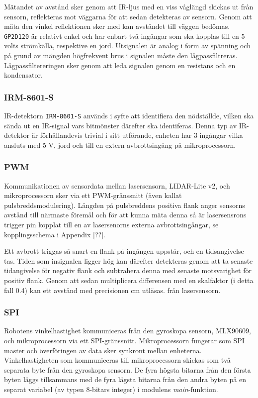 \documentclass[11pt]{article}
\begin{document}
\begin{flushleft}
Mätandet av avstånd sker genom att IR-ljus med en viss våglängd skickas ut från sensorn, reflekteras mot väggarna för att sedan detekteras av sensorn. Genom att mäta den vinkel reflektionen sker med kan avståndet till väggen bedömas. \verb+GP2D120+ är relativt enkel och har enbart två ingångar som ska kopplas till en 5 volts strömkälla, respektive en jord.  Utsignalen är analog i form av spänning och på grund av mängden högfrekvent brus i signalen måste den lågpassfiltreras. Lågpassfiltereringen sker genom att leda signalen genom en resistans och en kondensator.

\subsubsection{IRM-8601-S}
IR-detektorn \verb+IRM-8601-S+ används i syfte att identifiera den nödställde, vilken ska sända ut en IR-signal vars bitmönster därefter ska identiferas. Denna typ av IR-detektor är förhållandevis trivial i sitt utförande, enheten har 3 ingångar vilka ansluts med 5 V, jord och till en extern avbrottsingång på mikroprocessorn. 

\subsubsection{PWM}
Kommunikationen av sensordata mellan lasersensorn, LIDAR-Lite v2, och mikroprocessorn sker via ett PWM-gränssnitt (även kallat pulsbreddsmodulering). Längden på pulsbreddens positiva flank anger sensorns avstånd till närmaste föremål och för att kunna mäta denna så är lasersensrons trigger pin kopplat till en av lasersenorns externa avbrottsingångar, se kopplingsschema i Appendix [??]. 

Ett avbrott triggas så snart en flank på ingången uppstår, och en tidsangivelse tas. Tiden som insignalen ligger hög kan därefter detekteras genom att ta senaste tidangivelse för negativ flank och subtrahera denna med senaste motsvarighet för positiv flank. Genom att sedan multiplicera differensen med en skalfaktor (i detta fall 0.4) kan ett avstånd med precisionen cm utläsas. från lasersensorn. 

\subsubsection{SPI}
Robotens vinkelhastighet kommuniceras från den gyroskopa sensorn, MLX90609, och mikroprocessorn via ett SPI-gränssnitt. Mikroprocessorn fungerar som SPI master och överföringen av data sker synkront mellan enheterna. Vinkelhastigheten som kommuniceras till mikroprocessorn skickas som två separata byte från den gyroskopa sensorn. De fyra högsta bitarna från den första byten läggs tillsammans med de fyra lägsta bitarna från den andra byten på en separat variabel (av typen 8-bitars integer) i modulens \textit{main}-funktion. 


\end{flushleft}
\end{document}
